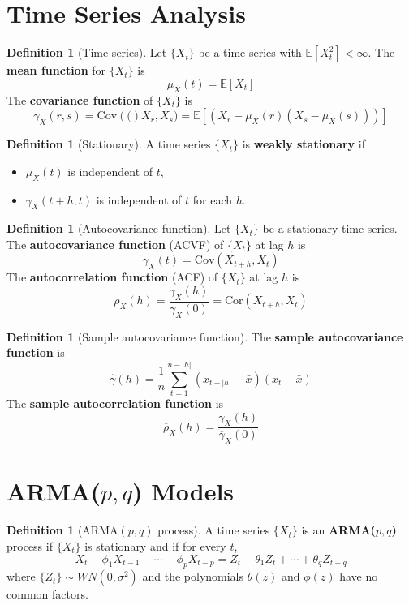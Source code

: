\documentclass[10pt, oneside, reqno]{amsart}
\theoremstyle{plain}%
\theoremstyle{definition}
\newtheorem{defn}[thm]{Definition}
\theoremstyle{remark}
\newcommand{\expc}[1]{\mathbb{E}\left[#1\right]}
\newcommand{\cov}[1]{\text{Cov}\left(#1\right)}
\newcommand{\ts}[1]{\{ #1 \}}
\newcommand{\ol}{\overline}
\begin{document}
\section{Time Series Analysis} %
\label{sec:time_series_analysis}

\begin{defn}[Time series]
    Let $\ts{X_t}$ be a time series with $\expc{X_t^2} < \infty$.  The \textbf{mean function} for $\ts{X_t}$ is \[
        \mu_X(t) = \expc{X_t}
    \]
    The \textbf{covariance function} of $\ts{X_t}$ is \[
        \gamma_X(r,s) = \cov(X_r, X_s) = \expc{(X_r - \mu_X(r)(X_s - \mu_X(s)))}
    \]
\end{defn}

\begin{defn}[Stationary]
    A time series $\ts{X_t}$ is \textbf{weakly stationary} if 
    \begin{itemize}
        \item $\mu_X(t)$ is independent of $t$,
        \item $\gamma_X(t+h,t)$ is independent of $t$ for each $h$.
    \end{itemize}
\end{defn}

\begin{defn}[Autocovariance function]
    Let $\ts{X_t}$ be a stationary time series.  The \textbf{autocovariance function} (ACVF) of $\ts{X_t}$ at lag $h$ is \[
        \gamma_X(t) = \cov{X_{t+h}, X_t}
    \]
    The \textbf{autocorrelation function} (ACF) of $\ts{X_t}$ at lag $h$ is \[
        \rho_X(h) = \frac{\gamma_X(h)}{\gamma_X(0)} = \text{Cor}({X_{t+h}, X_t})
    \]
\end{defn}

\begin{defn}[Sample autocovariance function]
    The \textbf{sample autocovariance function} is \[
        \hat{\gamma}(h) = \frac{1}{n} \sum_{t=1}^{n-|h|} (x_{t+|h|} - \bar{x})(x_t - \bar{x})
    \]
    The \textbf{sample autocorrelation function} is \[
            \ol{\rho}_X(h) = \frac{\ol{\gamma}_X(h)}{\ol{\gamma}_X(0)}
    \]
\end{defn}


\section{ARMA($p,q$) Models} %
\label{sec:arma_model}

\begin{defn}[ARMA$(p,q)$ process]
    A time series $\ts{X_t}$ is an \textbf{ARMA($p,q$)} process if $\ts{X_t}$ is stationary and if for every $t$,\[
        X_t - \phi_1 X_{t-1} - \cdots - \phi_p X_{t-p} = Z_t + \theta_1 Z_t + \cdots + \theta_q Z_{t-q}
    \] where $\ts{Z_t} \sim WN(0,\sigma^2)$ and the polynomials $\theta(z)$ and $\phi(z)$ have no common factors.
\end{defn}
\end{document}
